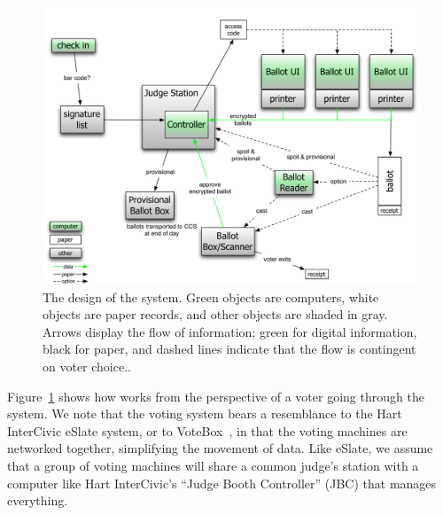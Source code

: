 \label{sec:voterflow}

\begin{figure}
\includegraphics[width=6.5in]{TravisVote.pdf}
\caption{The design of the \projname system. Green objects are computers, white objects are paper records, and other objects are shaded in gray. Arrows display the flow of information; green for digital information, black for paper, and dashed lines indicate that the flow is contingent on voter choice.\label{fig:design}.}
\end{figure}

Figure~\ref{fig:design} shows how \projname works from the perspective
of a voter going through the system. We note that the \projname voting system bears a resemblance to the Hart InterCivic eSlate system, or to VoteBox~\cite{sandler08votebox}, in that the voting machines are networked together, simplifying the movement of data. Like eSlate, we assume that a group of voting machines will share a common judge's station with a computer like Hart InterCivic's ``Judge Booth Controller'' (JBC) that manages everything. 

